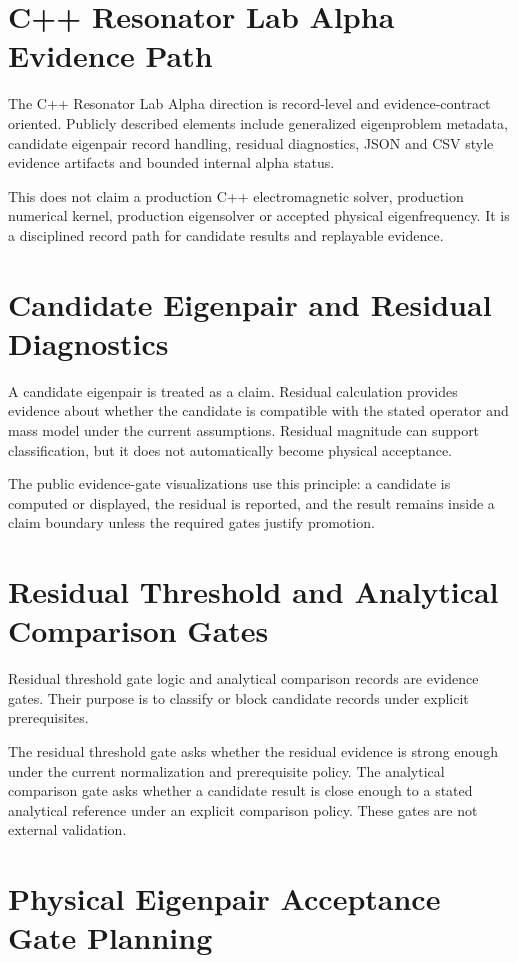 \documentclass[11pt,a4paper]{article}
\begin{document}
\section{C++ Resonator Lab Alpha Evidence Path}

The C++ Resonator Lab Alpha direction is record-level and evidence-contract oriented. Publicly described elements include generalized eigenproblem metadata, candidate eigenpair record handling, residual diagnostics, JSON and CSV style evidence artifacts and bounded internal alpha status.

This does not claim a production C++ electromagnetic solver, production numerical kernel, production eigensolver or accepted physical eigenfrequency. It is a disciplined record path for candidate results and replayable evidence.

\section{Candidate Eigenpair and Residual Diagnostics}

A candidate eigenpair is treated as a claim. Residual calculation provides evidence about whether the candidate is compatible with the stated operator and mass model under the current assumptions. Residual magnitude can support classification, but it does not automatically become physical acceptance.

The public evidence-gate visualizations use this principle: a candidate is computed or displayed, the residual is reported, and the result remains inside a claim boundary unless the required gates justify promotion.

\section{Residual Threshold and Analytical Comparison Gates}

Residual threshold gate logic and analytical comparison records are evidence gates. Their purpose is to classify or block candidate records under explicit prerequisites.

The residual threshold gate asks whether the residual evidence is strong enough under the current normalization and prerequisite policy. The analytical comparison gate asks whether a candidate result is close enough to a stated analytical reference under an explicit comparison policy. These gates are not external validation.

\section{Physical Eigenpair Acceptance Gate Planning}
\end{document}

